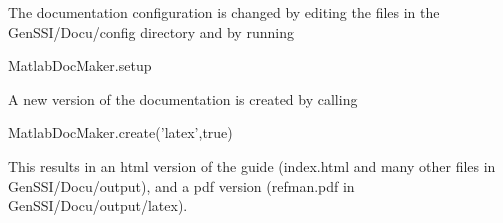 The documentation configuration is changed by editing the files in the Gen\+S\+S\+I/\+Docu/config directory and by running


\begin{DoxyCode}
MatlabDocMaker.setup 
\end{DoxyCode}


A new version of the documentation is created by calling


\begin{DoxyCode}
MatlabDocMaker.create(\textcolor{stringliteral}{'latex'},\textcolor{keyword}{true}) 
\end{DoxyCode}


This results in an html version of the guide (index.\+html and many other files in Gen\+S\+S\+I/\+Docu/output), and a pdf version (refman.\+pdf in Gen\+S\+S\+I/\+Docu/output/latex). 